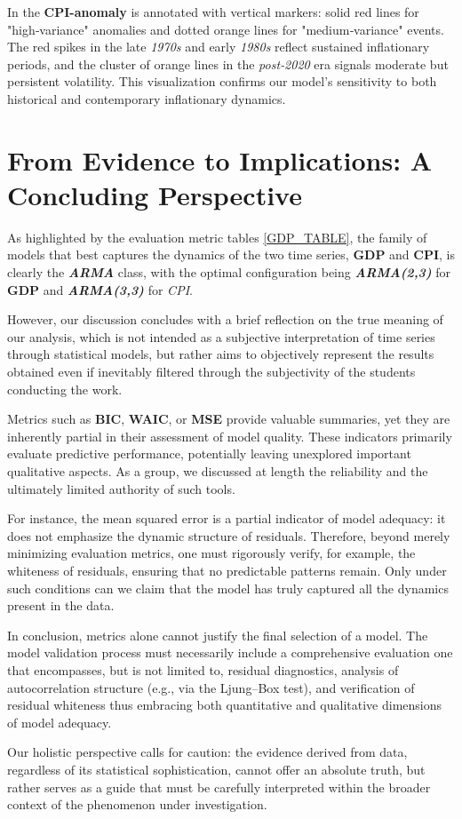 \documentclass{Configuration_Files/PoliMi3i_thesis}
\begin{document}
In the \textbf{CPI-anomaly} is annotated with vertical markers: solid red lines for "high‐variance" anomalies and dotted orange lines for "medium‐variance" events. The red spikes in the late \textit{1970s} and early \textit{1980s} reflect sustained inflationary periods, and the cluster of orange lines in the \textit{post‐2020} era signals moderate but persistent volatility. This visualization confirms our model’s sensitivity to both historical and contemporary inflationary dynamics.

\chapter{From Evidence to Implications: A Concluding Perspective}
As highlighted by the evaluation metric tables \ref{GDP_TABLE}, the family of models that best captures the dynamics of the two time series, \textbf{GDP} and \textbf{CPI}, is clearly the \textbf{\textit{ARMA}} class, with the optimal configuration being \textbf{\textit{ARMA(2,3)}} for \textbf{GDP} and \textbf{\textit{ARMA(3,3)}} for \textit{CPI}.

However, our discussion concludes with a brief reflection on the true meaning of our analysis, which is not intended as a subjective interpretation of time series through statistical models, but rather aims to objectively represent the results obtained even if inevitably filtered through the subjectivity of the students conducting the work.

Metrics such as \textbf{BIC}, \textbf{WAIC}, or \textbf{MSE} provide valuable summaries, yet they are inherently partial in their assessment of model quality. These indicators primarily evaluate predictive performance, potentially leaving unexplored important qualitative aspects. As a group, we discussed at length the reliability and the ultimately limited authority of such tools. 

For instance, the mean squared error is a partial indicator of model adequacy: it does not emphasize the dynamic structure of residuals. Therefore, beyond merely minimizing evaluation metrics, one must rigorously verify, for example, the whiteness of residuals, ensuring that no predictable patterns remain. Only under such conditions can we claim that the model has truly captured all the dynamics present in the data.

In conclusion, metrics alone cannot justify the final selection of a model. The model validation process must necessarily include a comprehensive evaluation one that encompasses, but is not limited to, residual diagnostics, analysis of autocorrelation structure (e.g., via the Ljung–Box test), and verification of residual whiteness thus embracing both quantitative and qualitative dimensions of model adequacy. 

Our holistic perspective calls for caution: the evidence derived from data, regardless of its statistical sophistication, cannot offer an absolute truth, but rather serves as a guide that must be carefully interpreted within the broader context of the phenomenon under investigation.
\end{document}
